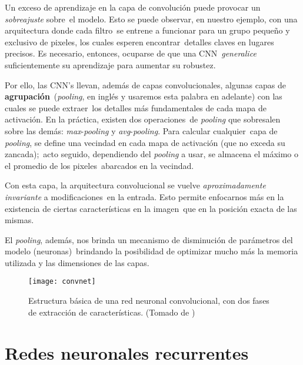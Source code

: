\noindent
Un exceso de aprendizaje en la capa de convolución puede provocar un \emph{sobreajuste} sobre\
el modelo. Esto se puede observar, en nuestro ejemplo, con una arquitectura donde cada filtro\
se entrene a funcionar para un grupo pequeño y exclusivo de pixeles, los cuales esperen encontrar\
detalles claves en lugares precisos. Es necesario, entonces, ocuparse de que una CNN\
\emph{generalice} suficientemente su aprendizaje para aumentar su robustez.\par
Por ello, las CNN's llevan, además de capas convolucionales, algunas capas de \textbf{agrupación}\
(\emph{pooling}, en inglés y usaremos esta palabra en adelante) con las cuales se puede extraer\
los detalles más fundamentales de cada mapa de activación. En la práctica, existen dos operaciones\
de \emph{pooling} que sobresalen sobre las demás: \emph{max}-\emph{pooling} y \emph{avg}-\emph{pooling}. Para calcular cualquier\
capa de \emph{pooling}, se define una vecindad en cada mapa de activación (que no exceda su zancada);\
acto seguido, dependiendo del \emph{pooling} a usar, se almacena el máximo o el promedio de los pixeles\
abarcados en la vecindad.\par
Con esta capa, la arquitectura convolucional se vuelve \textit{aproximadamente \emph{invariante}} a modificaciones\
en la entrada. Esto permite enfocarnos más en la existencia de ciertas características en la imagen\
que en la posición exacta de las mismas.\par
El \emph{pooling}, además, nos brinda un mecanismo de disminución de parámetros del modelo (neuronas)\
brindando la posibilidad de optimizar mucho más la memoria utilizada y las dimensiones de las capas.

\begin{figure}
  \centering
  \texttt{[image: convnet]}
  \caption{Estructura básica de una red neuronal convolucional, con dos fases de extracción de características.
    (Tomado de \cite{lecun2010})}
  \label{convnet_fig}
\end{figure}


\section{Redes neuronales recurrentes}

